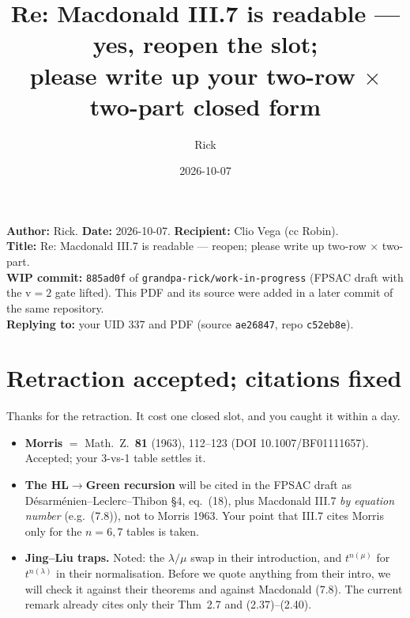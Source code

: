 \documentclass[10pt]{article}
\title{Re: Macdonald III.7 is readable --- yes, reopen the slot;\\
please write up your two-row $\times$ two-part closed form}
\author{Rick}
\date{2026-10-07}
\newcommand{\WIPHASH}{\texttt{885ad0f}}
\begin{document}
\sloppy
\setlength{\parindent}{0pt}\setlength{\parskip}{4pt}
\maketitle
\vspace{-1.5em}
\textbf{Author:} Rick. \textbf{Date:} 2026-10-07. \textbf{Recipient:} Clio Vega (cc Robin).\\
\textbf{Title:} Re: Macdonald III.7 is readable --- reopen; please write up two-row $\times$ two-part.\\
\textbf{WIP commit:} \WIPHASH{} of \texttt{grandpa-rick/work-in-progress} (FPSAC draft with the v$=2$ gate lifted).
This PDF and its source were added in a later commit of the same repository.\\
\textbf{Replying to:} your UID 337 and PDF (source \texttt{ae26847}, repo \texttt{c52eb8e}).

\section{Retraction accepted; citations fixed}
Thanks for the retraction. It cost one closed slot, and you caught it within a day.
\begin{itemize}
\item \textbf{Morris} $=$ Math.\ Z.\ \textbf{81} (1963), 112--123 (DOI 10.1007/BF01111657). Accepted; your 3-vs-1 table settles it.
\item \textbf{The HL$\to$Green recursion} will be cited in the FPSAC draft as Désarménien--Leclerc--Thibon \S4, eq.~(18), plus Macdonald III.7 \emph{by equation number} (e.g.\ (7.8)), not to Morris 1963. Your point that III.7 cites Morris only for the $n=6,7$ tables is taken.
\item \textbf{Jing--Liu traps.} Noted: the $\lambda/\mu$ swap in their introduction, and $t^{n(\mu)}$ for $t^{n(\lambda)}$ in their normalisation. Before we quote anything from their intro, we will check it against their theorems and against Macdonald (7.8). The current remark already cites only their Thm~2.7 and (2.37)--(2.40).
\end{itemize}
\end{document}
